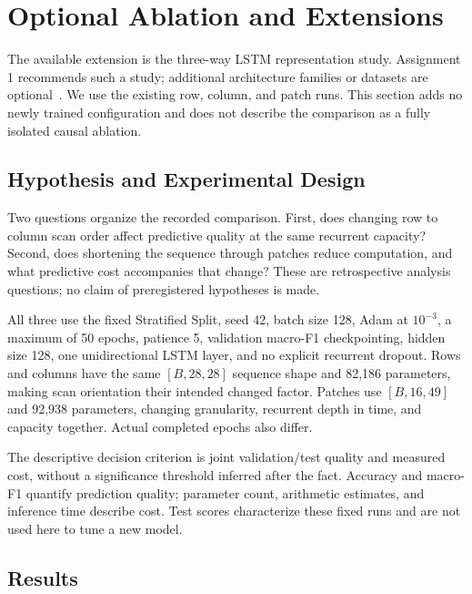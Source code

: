 \section{Optional Ablation and Extensions}
\label{sec:extensions}

The available extension is the three-way LSTM representation study. Assignment 1 recommends such a study; additional architecture families or datasets are optional~\cite{course-handbook}. We use the existing row, column, and patch runs. This section adds no newly trained configuration and does not describe the comparison as a fully isolated causal ablation.

\subsection{Hypothesis and Experimental Design}

Two questions organize the recorded comparison. First, does changing row to column scan order affect predictive quality at the same recurrent capacity? Second, does shortening the sequence through patches reduce computation, and what predictive cost accompanies that change? These are retrospective analysis questions; no claim of preregistered hypotheses is made.

All three use the fixed Stratified Split, seed 42, batch size 128, Adam at $10^{-3}$, a maximum of 50 epochs, patience 5, validation macro-F1 checkpointing, hidden size 128, one unidirectional LSTM layer, and no explicit recurrent dropout. Rows and columns have the same $[B,28,28]$ sequence shape and 82,186 parameters, making scan orientation their intended changed factor. Patches use $[B,16,49]$ and 92,938 parameters, changing granularity, recurrent depth in time, and capacity together. Actual completed epochs also differ.

The descriptive decision criterion is joint validation/test quality and measured cost, without a significance threshold inferred after the fact. Accuracy and macro-F1 quantify prediction quality; parameter count, arithmetic estimates, and inference time describe cost. Test scores characterize these fixed runs and are not used here to tune a new model.

\subsection{Results}

\begin{table}[H]
    \centering
    \caption{Changes relative to LSTM rows. Accuracy and macro-F1 changes are percentage points; parameter and inference changes are relative percentages. Negative inference change means a shorter recorded batched forward time.}
    \label{tab:a1-representation-deltas}
    \small
    \setlength{\tabcolsep}{4pt}
    
\end{table}

